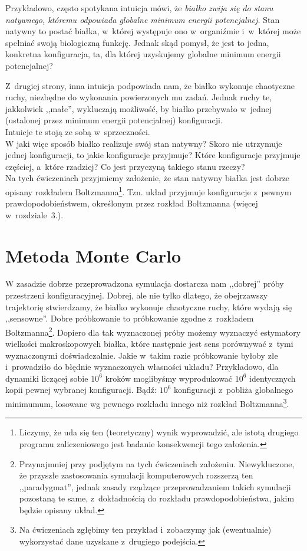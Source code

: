 \documentclass[a4paper,11pt,twoside]{book}
\begin{document}
Przykładowo, często spotykana intuicja mówi, że \emph{białko zwija się do stanu natywnego, któremu odpowiada globalne minimum energii potencjalnej.} Stan natywny to postać białka, w~której występuje ono w~organiźmie i~w~której może spełniać swoją biologiczną funkcję. Jednak skąd pomysł, że jest to jedna, konkretna konfiguracja, ta, dla której uzyskujemy globalne minimum energii potencjalnej? 

Z~drugiej strony, inna intuicja podpowiada nam, że białko wykonuje chaotyczne ruchy, niezbędne do wykonania powierzonych mu zadań. Jednak ruchy te, jakkolwiek ,,małe'', wykluczają możliwość, by białko przebywało w~jednej (ustalonej przez minimum energii potencjalnej) konfiguracji.\\

Intuicje te stoją ze sobą w~sprzeczności.\\

W jaki więc sposób białko realizuje swój stan natywny? Skoro nie utrzymuje jednej konfiguracji, to jakie konfiguracje przyjmuje? Które konfiguracje przyjmuje częściej, a~które rzadziej? Co jest przyczyną takiego stanu rzeczy?\\

Na tych ćwiczeniach przyjmiemy założenie, że stan natywny białka jest dobrze opisany rozkładem Boltzmanna\footnote{Liczymy, że uda się ten (teoretyczny) wynik wyprowadzić, ale istotą drugiego programu zaliczeniowego jest badanie konsekwencji tego założenia.}. Tzn. układ przyjmuje konfiguracje z~pewnym prawdopodobieństwem, określonym przez rozkład Boltzmanna (więcej w~rozdziale~3.).\\

\section{Metoda Monte Carlo}
W zasadzie dobrze przeprowadzona symulacja dostarcza nam ,,dobrej'' próby przestrzeni konfiguracyjnej. Dobrej, ale nie tylko dlatego, że obejrzawszy trajektorię stwierdzamy, że białko wykonuje chaotyczne ruchy, które wydają się ,,sensowne''. Dobre próbkowanie to próbkowanie zgodne z~rozkładem Boltzmanna\footnote{Przynajmniej przy podjętym na tych ćwiczeniach założeniu. Niewykluczone, że przyszłe zastosowania symulacji komputerowych rozszerzą ten ,,paradygmat'', jednak zasady rządzące przeprowadzaniem takich symulacji pozostaną te same, z~dokładnością do rozkładu prawdopodobieństwa, jakim będzie opisany układ.}. Dopiero dla tak wyznaczonej próby możemy wyznaczyć estymatory wielkości makroskopowych białka, które następnie jest sens porównywać z~tymi wyznaczonymi doświadczalnie. Jakie w~takim razie próbkowanie byłoby złe i~prowadziło do błędnie wyznaczonych własności układu? Przykładowo, dla dynamiki liczącej sobie $10^6$ kroków moglibyśmy wyprodukować $10^6$ identycznych kopii pewnej wybranej konfiguracji. Bądź: $10^6$ konfiguracji z~pobliża globalnego minimumum, losowane wg pewnego rozkładu innego niż rozkład Boltzmanna\footnote{Na ćwiczeniach zgłębimy ten przykład i~zobaczymy jak (ewentualnie) wykorzystać dane uzyskane z~drugiego podejścia.}.\\
\end{document}

